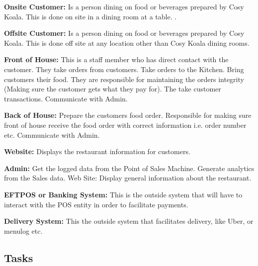 \documentclass{article}
\begin{document}
\textbf{Onsite Customer:} Is a person dining on food or beverages prepared by Cosy Koala. This is done on site in a dining room at a table. .

\textbf{Offsite Customer:} Is a person dining on food or beverages prepared by Cosy Koala. This is done off site at any location other than Cosy Koala dining rooms.

\textbf{Front of House:} This is a staff member who has direct contact with the customer. They take orders from customers. Take orders to the Kitchen. Bring customers their food. They are responsible for maintaining the orders integrity (Making sure the customer gets what they pay for). The take customer transactions. Communicate with Admin.

\textbf{Back of House:} Prepare the customers food order. Responsible for making sure front of house receive the food order with correct information i.e. order number etc. Communicate with Admin.

\textbf{Website:} Displays the restaurant information for customers.

\textbf{Admin:} Get the logged data from the Point of Sales Machine.
Generate analytics from the Sales data.
Web Site: Display general information about the restaurant.

\textbf{EFTPOS or Banking System:} This is the outside system that will have to interact with the POS entity in order to facilitate payments.

\textbf{Delivery System:} This the outside system that facilitates delivery, like Uber, or menulog etc.

\clearpage
\subsection{Tasks}
\end{document}
